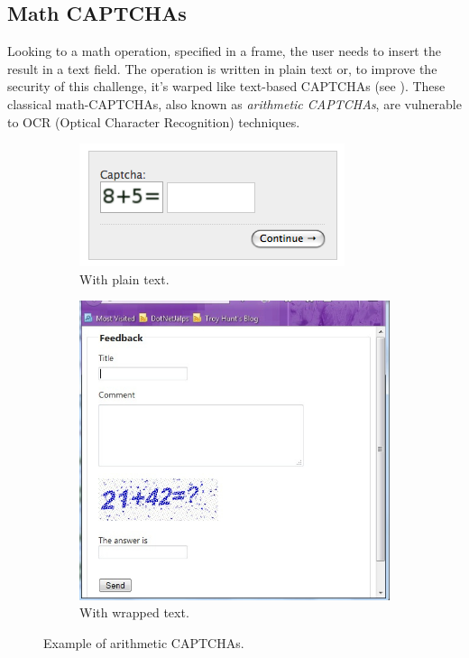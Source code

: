 \subsection{Math CAPTCHAs}
Looking to a math operation, specified in a frame, the user needs to insert the result in a text field. The operation is written in plain text or, to improve the security of this challenge, it's warped like text-based CAPTCHAs (see ). These classical math-CAPTCHAs, also known as \textit{arithmetic CAPTCHAs}, are vulnerable to OCR (Optical Character Recognition) techniques.\\
\begin{figure}[h]
     \centering
     \begin{subfigure}[b]{0.48\textwidth}
         \centering
         \includegraphics[width=.7\linewidth]{Images/StateOfArt/math_CAPTCHA}
         \caption{\footnotesize{With plain text.}}
     \end{subfigure}
     \hfill
     \begin{subfigure}[b]{0.48\textwidth}
         \centering
         \includegraphics[width=.7\textwidth]{Images/StateOfArt/math_CAPTCHA2}
         \caption{\footnotesize{With wrapped text.}}
     \end{subfigure}
		\caption{\footnotesize{Example of arithmetic CAPTCHAs.}}
		\label{soa:arithmetic}
\end{figure}

